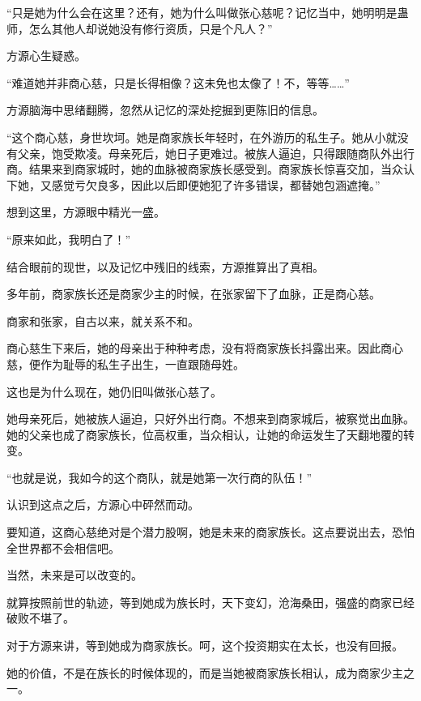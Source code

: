 
\begin{this_body}



“只是她为什么会在这里？还有，她为什么叫做张心慈呢？记忆当中，她明明是蛊师，怎么其他人却说她没有修行资质，只是个凡人？”

方源心生疑惑。

“难道她并非商心慈，只是长得相像？这未免也太像了！不，等等……”

方源脑海中思绪翻腾，忽然从记忆的深处挖掘到更陈旧的信息。

“这个商心慈，身世坎坷。她是商家族长年轻时，在外游历的私生子。她从小就没有父亲，饱受欺凌。母亲死后，她日子更难过。被族人逼迫，只得跟随商队外出行商。结果来到商家城时，她的血脉被商家族长感受到。商家族长惊喜交加，当众认下她，又感觉亏欠良多，因此以后即便她犯了许多错误，都替她包涵遮掩。”

想到这里，方源眼中精光一盛。

“原来如此，我明白了！”

结合眼前的现世，以及记忆中残旧的线索，方源推算出了真相。

多年前，商家族长还是商家少主的时候，在张家留下了血脉，正是商心慈。

商家和张家，自古以来，就关系不和。

商心慈生下来后，她的母亲出于种种考虑，没有将商家族长抖露出来。因此商心慈，便作为耻辱的私生子出生，一直跟随母姓。

这也是为什么现在，她仍旧叫做张心慈了。

她母亲死后，她被族人逼迫，只好外出行商。不想来到商家城后，被察觉出血脉。她的父亲也成了商家族长，位高权重，当众相认，让她的命运发生了天翻地覆的转变。

“也就是说，我如今的这个商队，就是她第一次行商的队伍！”

认识到这点之后，方源心中砰然而动。

要知道，这商心慈绝对是个潜力股啊，她是未来的商家族长。这点要说出去，恐怕全世界都不会相信吧。

当然，未来是可以改变的。

就算按照前世的轨迹，等到她成为族长时，天下变幻，沧海桑田，强盛的商家已经破败不堪了。

对于方源来讲，等到她成为商家族长。呵，这个投资期实在太长，也没有回报。

她的价值，不是在族长的时候体现的，而是当她被商家族长相认，成为商家少主之一。


\end{this_body}
